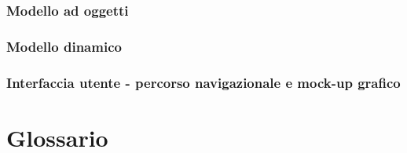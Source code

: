 \documentclass[12pt]{article}
\begin{document}
\subsubsection{Modello ad oggetti}
\subsubsection{Modello dinamico}
\subsubsection{Interfaccia utente - percorso navigazionale e mock-up grafico}
\section{Glossario}
\end{document}
